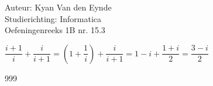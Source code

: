 \documentclass[a4paper]{article}
\begin{document}
  
\noindent \large Auteur: Kyan Van den Eynde \\
\noindent \large Studierichting: Informatica\\
\noindent \large Oefeningenreeks 1B nr. 15.3\\

\medskip

\normalsize

$\dfrac{i+1}{i}+\dfrac{i}{i+1} = \left(1 + \dfrac{1}{i}\right) + \dfrac{i}{i+1} = 1-i+\dfrac{1+i}{2} = \dfrac{3-i}{2}$\\

\begin{thebibliography}{999}
\end{thebibliography}
\end{document}
